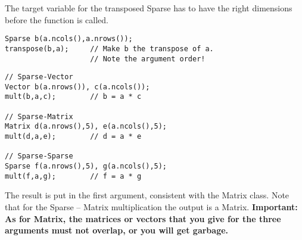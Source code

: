 The target variable for the transposed Sparse has to have the right
dimensions before the function is called.
\begin{verbatim}
Sparse b(a.ncols(),a.nrows());
transpose(b,a);     // Make b the transpose of a.
                    // Note the argument order!
\end{verbatim}

\begin{verbatim}
// Sparse-Vector
Vector b(a.nrows()), c(a.ncols());
mult(b,a,c);        // b = a * c

// Sparse-Matrix
Matrix d(a.nrows(),5), e(a.ncols(),5);
mult(d,a,e);        // d = a * e

// Sparse-Sparse
Sparse f(a.nrows(),5), g(a.ncols(),5);
mult(f,a,g);        // f = a * g
\end{verbatim}
The result is put in the first argument, consistent with the Matrix class.
Note that for the Sparse -- Matrix multiplication the output is a Matrix.
\textbf{Important: As for Matrix, the matrices or vectors
that you give for the three arguments must not overlap, or you will get
garbage.}





